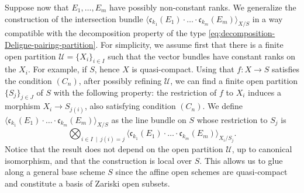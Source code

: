 \documentclass[11pt]{article}
\theoremstyle{plain}
\theoremstyle{definition}
\newcommand{\Ucal}{\mathcal U}
\newcommand{\cfrak}{\mathfrak c}
\begin{document}
Suppose now that $E_{1},\ldots, E_{m}$ have possibly non-constant ranks. We generalize the construction of the intersection bundle $\langle \cfrak_{k_{1}}(E_{1})\cdot\ldots \cdot \cfrak_{k_{m}}(E_{m})\rangle_{X/S}$ in a way compatible with the decomposition property of the type \eqref{eq:decomposition-Deligne-pairing-partition}. For simplicity, we assume first that there is a finite open partition $\Ucal=\lbrace X_{i}\rbrace_{i\in I}$ such that the vector bundles have constant ranks on the $X_{i}$. For example, if $S$, hence $X$ is quasi-compact. Using that $f\colon X\to S$ satisfies the condition $(C_{n})$, after possibly refining $\Ucal$, we can find a finite open partition $\lbrace S_{j}\rbrace_{j\in J}$ of $S$ with the following property: the restriction of $f$ to $X_{i}$ induces a morphism $X_{i}\to S_{j(i)}$, also satisfying condition $(C_{n})$. We define $\langle \cfrak_{k_{1}}(E_{1})\cdot\ldots \cdot \cfrak_{k_{m}}(E_{m})\rangle_{X/S}$ as the line bundle on $S$ whose restriction to $S_{j}$ is\vspace*{-3pt}
\begin{equation}\label{eq:def-intersection-bundle-open-partitions}
\bigotimes_{i\in I\ \mid\ j(i)=j}\langle \cfrak_{k_{1}}(E_{1})\cdot\ldots \cdot \cfrak_{k_{m}}(E_{m})\rangle_{X_{i}/S_{j}}.
\end{equation}
Notice that the result does not depend on the open partition $\Ucal$, up to canonical isomorphism, and that the construction is local over $S$. This allows us to glue along a general base scheme $S$ since the affine open schemes are quasi-compact and constitute a basis of Zariski open subsets.
\end{document}
